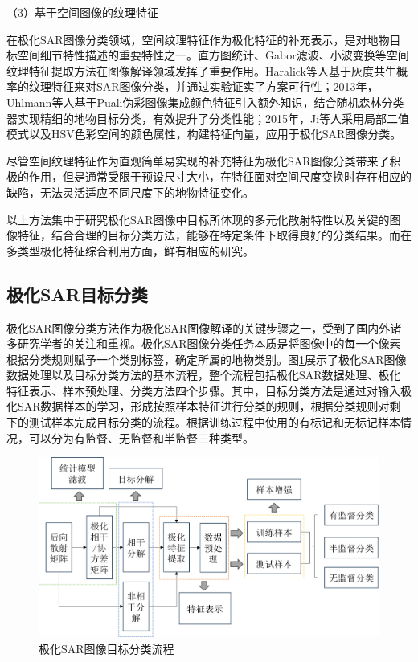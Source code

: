 （3）基于空间图像的纹理特征

在极化SAR图像分类领域，空间纹理特征作为极化特征的补充表示，是对地物目标空间细节特性描述的重要特性之一。直方图统计、Gabor滤波、小波变换等空间纹理特征提取方法在图像解译领域发挥了重要作用。Haralick等人基于灰度共生概率的纹理特征来对SAR图像分类，并通过实验证实了方案可行性；2013年，Uhlmann等人基于Puali伪彩图像集成颜色特征引入额外知识，结合随机森林分类器实现精细的地物目标分类，有效提升了分类性能；2015年，Ji等人采用局部二值模式以及HSV色彩空间的颜色属性，构建特征向量，应用于极化SAR图像分类。

尽管空间纹理特征作为直观简单易实现的补充特征为极化SAR图像分类带来了积极的作用，但是通常受限于预设尺寸大小，在特征面对空间尺度变换时存在相应的缺陷，无法灵活适应不同尺度下的地物特征变化。

以上方法集中于研究极化SAR图像中目标所体现的多元化散射特性以及关键的图像特征，结合合理的目标分类方法，能够在特定条件下取得良好的分类结果。而在多类型极化特征综合利用方面，鲜有相应的研究。

\subsection{极化SAR目标分类}
极化SAR图像分类方法作为极化SAR图像解译的关键步骤之一，受到了国内外诸多研究学者的关注和重视。极化SAR图像分类任务本质是将图像中的每一个像素根据分类规则赋予一个类别标签，确定所属的地物类别。图\ref{fig:极化SAR图像目标分类流程}展示了极化SAR图像数据处理以及目标分类方法的基本流程，整个流程包括极化SAR数据处理、极化特征表示、样本预处理、分类方法四个步骤。其中，目标分类方法是通过对输入极化SAR数据样本的学习，形成按照样本特征进行分类的规则，根据分类规则对剩下的测试样本完成目标分类的流程。根据训练过程中使用的有标记和无标记样本情况，可以分为有监督、无监督和半监督三种类型。

\begin{figure}[ht!]
    \includegraphics[width=12.3cm]{pic/chapter1/极化SAR分类流程.png}
    \caption{极化SAR图像目标分类流程}
    \label{fig:极化SAR图像目标分类流程}
\end{figure}


